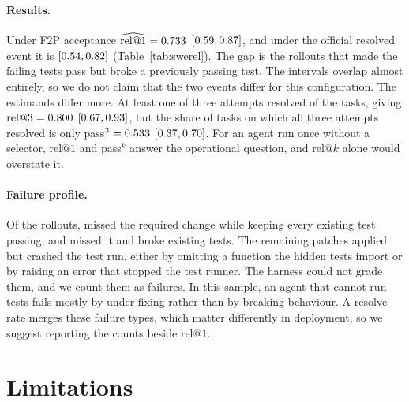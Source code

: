\documentclass[11pt,a4paper]{article}
\makeatletter
\newcommand{\relk}[1]{\mathrm{rel}@#1}
\makeatother
\begin{document}
\paragraph{Results.}
Under F2P acceptance $\widehat{\relk{1}}=\sweSonnetFPRelone$ $[0.59, 0.87]$, and under the official resolved event it is \sweSonnetResolvedRelone{} $[0.54, 0.82]$ (Table~\ref{tab:swerel}). The gap is the \sweSonnetProfileFixedButRegressed{} rollouts that made the failing tests pass but broke a previously passing test. The intervals overlap almost entirely, so we do not claim that the two events differ for this configuration. The estimands differ more. At least one of three attempts resolved \sweSonnetResolvedSolved{} of the \sweNTasks{} tasks, giving $\relk{\sweAttempts}=\sweSonnetResolvedRelk$ $[0.67, 0.93]$, but the share of tasks on which all three attempts resolved is only pass$^{3}=0.533$ $[0.37, 0.70]$. For an agent run once without a selector, $\relk{1}$ and pass$^k$ answer the operational question, and $\relk{k}$ alone would overstate it.

\paragraph{Failure profile.}
Of the \sweSonnetRollouts{} rollouts, \sweSonnetProfileMissedClean{} missed the required change while keeping every existing test passing, and \sweSonnetProfileMissedRegressed{} missed it and broke existing tests. The remaining \sweSonnetProfileNoPatch{} patches applied but crashed the test run, either by omitting a function the hidden tests import or by raising an error that stopped the test runner. The harness could not grade them, and we count them as failures. In this sample, an agent that cannot run tests fails mostly by under-fixing rather than by breaking behaviour. A resolve rate merges these failure types, which matter differently in deployment, so we suggest reporting the counts beside $\relk{1}$.

\section{Limitations}
\label{sec:limits}
\end{document}
